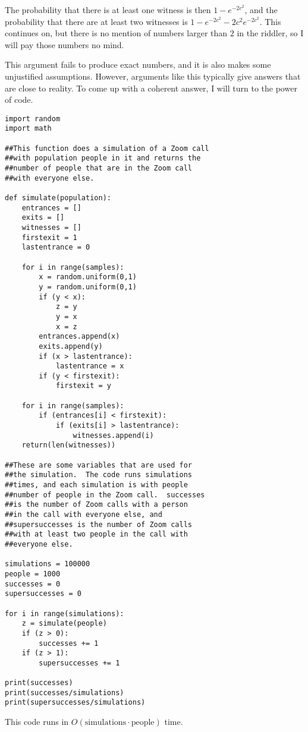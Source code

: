 \documentclass[11pt]{article}
\theoremstyle{definition}
\begin{document}
The probability that there is at least one witness is then $1 - e^{-2c^2}$, and the probability that there are at least two witnesses is $1-e^{-2c^2}-2c^2e^{-2c^2}$.  This continues on, but there is no mention of numbers larger than $2$ in the riddler, so I will pay those numbers no mind.

This argument fails to produce exact numbers, and it is also makes some unjustified assumptions.  However, arguments like this typically give answers that are close to reality.  To come up with a coherent answer, I will turn to the power of code.

\begin{verbatim}
import random
import math

##This function does a simulation of a Zoom call
##with population people in it and returns the
##number of people that are in the Zoom call
##with everyone else.

def simulate(population):
    entrances = []
    exits = []
    witnesses = []
    firstexit = 1
    lastentrance = 0

    for i in range(samples):
        x = random.uniform(0,1)
        y = random.uniform(0,1)
        if (y < x):
            z = y
            y = x
            x = z
        entrances.append(x)
        exits.append(y)
        if (x > lastentrance):
            lastentrance = x
        if (y < firstexit):
            firstexit = y

    for i in range(samples):
        if (entrances[i] < firstexit):
            if (exits[i] > lastentrance):
                witnesses.append(i)
    return(len(witnesses))

##These are some variables that are used for
##the simulation.  The code runs simulations
##times, and each simulation is with people
##number of people in the Zoom call.  successes
##is the number of Zoom calls with a person
##in the call with everyone else, and
##supersuccesses is the number of Zoom calls
##with at least two people in the call with
##everyone else.

simulations = 100000
people = 1000
successes = 0
supersuccesses = 0

for i in range(simulations):
    z = simulate(people)
    if (z > 0):
        successes += 1
    if (z > 1):
        supersuccesses += 1

print(successes)
print(successes/simulations)
print(supersuccesses/simulations)
\end{verbatim}
This code runs in $O(\text{simulations}\cdot\text{people})$ time.
\end{document}
